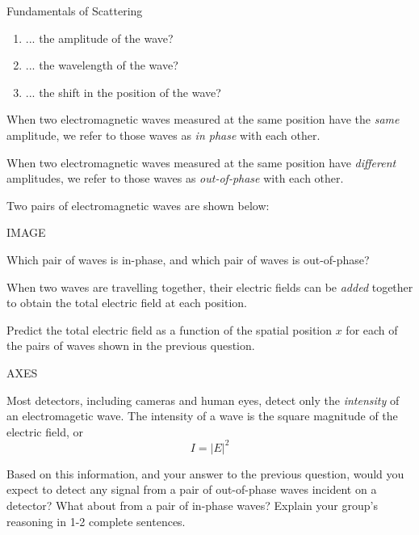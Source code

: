 \begin{activity}{Fundamentals of Scattering}
\begin{ctqs}
\begin{enumerate}
			\item ... the amplitude of the wave?
			
			\item ... the wavelength of the wave?
			
			\item ... the shift in the position of the wave?
		
		\end{enumerate}
		
\end{ctqs}

\begin{infobox}
	When two electromagnetic waves measured at the same position have the \emph{same} amplitude, we refer to those waves as \emph{in phase} with each other.
	
	When two electromagnetic waves measured at the same position have \emph{different} amplitudes, we refer to those waves as \emph{out-of-phase} with each other.
\end{infobox}

\begin{ctqs}

	\question Two pairs of electromagnetic waves are shown below:
	
		IMAGE
		
		Which pair of waves is in-phase, and which pair of waves is out-of-phase?
		
	\question When two waves are travelling together, their electric fields can be \emph{added} together to obtain the total electric field at each position.
	
		Predict the total electric field as a function of the spatial position $x$ for each of the pairs of waves shown in the previous question.
		
		AXES
		
	\question Most detectors, including cameras and human eyes, detect only the \emph{intensity} of an electromagetic wave.  The intensity of a wave is the square magnitude of the electric field, or
	\begin{equation*}
		I = |E|^2
	\end{equation*}
	
		Based on this information, and your answer to the previous question, would you expect to detect any signal from a pair of out-of-phase waves incident on a detector?  What about from a pair of in-phase waves?  Explain your group's reasoning in 1-2 complete sentences.

\end{ctqs}


\end{activity}
